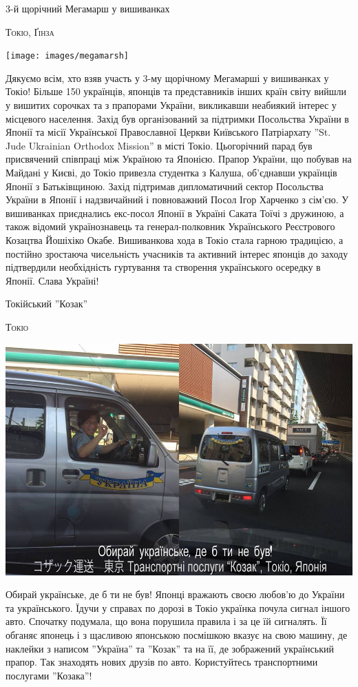 \documentclass[10pt,a4paper]{article}
\newcommand{\NewsItem}[1]{%
		\usefont{T2A}{iwona}{m}{n} 
		\large #1 \vspace{4pt}
		\par \normalsize \normalfont}
\newcommand{\NewsAuthor}[1]{%
			\hfill \textsc{#1} \vspace{4pt}
			\par \normalfont}
\begin{document}
\begin{multicols}{3}
\vspace{1cm}
	\NewsItem{3-й щорічний Мегамарш у вишиванках}
	\NewsAuthor{Токіо, Ґінза}
		\begin{center}
			\texttt{[image: images/megamarsh]}
		\end{center}
Дякуємо всім, хто взяв участь у 3-му щорічному Мегамарші у вишиванках у Токіо! Більше 150 українців, японців та представників інших країн світу вийшли у вишитих сорочках та з прапорами України, викликавши неабиякий інтерес у місцевого населення. Захід був організований за підтримки Посольства України в Японії та місії Української Православної Церкви Київського Патріархату ''St. Jude Ukrainian Orthodox Mission'' в місті Токіо. Цьогорічний парад був присвячений співпраці між Україною та Японією. Прапор України, що побував на Майдані у Києві, до Токіо привезла студентка з Калуша, об'єднавши українців Японії з Батьківщиною. Захід підтримав дипломатичний сектор Посольства України в Японії і надзвичайний і повноважний Посол Ігор Харченко з сім'єю. У вишиванках приєднались екс-посол Японії в Україні Саката Тоїчі з дружиною, а також відомий українознавець та генерал-полковник Українського Реєстрового Козацтва Йошіхіко Окабе. Вишиванкова хода в Токіо стала гарною традицією, а постійно зростаюча чисельність учасників та активний інтерес японців до заходу підтвердили необхідність гуртування та створення українського осередку в Японії. Слава Україні!

\vspace{1cm}
\NewsItem{Токійський ''Козак''}
\NewsAuthor{Токіо}
		\begin{center}
			\includegraphics[width=0.8\linewidth]{images/kozak}
		\end{center}
Обирай українське, де б ти не був! Японці вражають своєю любов'ю до України та українського. Їдучи у справах по дорозі в Токіо українка почула сигнал іншого авто. Спочатку подумала, що вона порушила правила і за це їй сигналять. Її обганяє японець і з щасливою японською посмішкою вказує на свою машину, де наклейки з написом ''Україна'' та ''Козак'' та на її, де зображений український прапор. Так знаходять нових друзів по авто. Користуйтесь транспортними послугами ''Козака''! 

\end{multicols}

\end{document}
